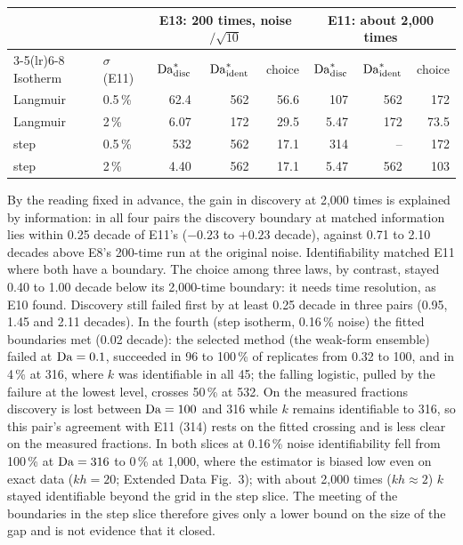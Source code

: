 \begin{center}
\small
\begin{tabular}{llrrrrrr}
\toprule
& & \multicolumn{3}{c}{E13: 200 times, noise$/\sqrt{10}$} & \multicolumn{3}{c}{E11: about 2,000 times} \\
\cmidrule(lr){3-5}\cmidrule(lr){6-8}
Isotherm & $\sigma$ (E11) & $\mathrm{Da}^{*}_{\mathrm{disc}}$ & $\mathrm{Da}^{*}_{\mathrm{ident}}$ & choice & $\mathrm{Da}^{*}_{\mathrm{disc}}$ & $\mathrm{Da}^{*}_{\mathrm{ident}}$ & choice \\
\midrule
Langmuir & 0.5\,\% & 62.4 & 562 & 56.6 & 107 & 562 & 172 \\
Langmuir & 2\,\% & 6.07 & 172 & 29.5 & 5.47 & 172 & 73.5 \\
step & 0.5\,\% & 532 & 562 & 17.1 & 314 & -- & 172 \\
step & 2\,\% & 4.40 & 562 & 17.1 & 5.47 & 562 & 103 \\
\bottomrule
\end{tabular}
\end{center}
By the reading fixed in advance, the gain in discovery at 2,000 times is explained by information: in all four
pairs the discovery boundary at matched information lies within 0.25 decade of E11's ($-0.23$ to $+0.23$
decade), against 0.71 to 2.10 decades above E8's 200-time run at the original noise. Identifiability matched E11
where both have a boundary. The choice among three laws, by contrast, stayed 0.40 to 1.00 decade below its
2,000-time boundary: it needs time resolution, as E10 found. Discovery still failed first by at least
0.25 decade in three pairs (0.95, 1.45 and 2.11 decades). In the fourth (step isotherm, 0.16\,\% noise) the
fitted boundaries met (0.02 decade): the selected method (the weak-form ensemble) failed at $\mathrm{Da} = 0.1$,
succeeded in 96 to 100\,\% of replicates from 0.32 to 100, and in 4\,\% at 316, where $k$ was identifiable in
all 45; the falling logistic, pulled by the failure at the lowest level, crosses 50\,\% at 532. On the
measured fractions discovery is lost between $\mathrm{Da} = 100$ and 316 while $k$ remains identifiable to 316, so
this pair's agreement with E11 (314) rests on the fitted crossing and is less clear on the measured fractions.
In both slices at 0.16\,\% noise identifiability fell from 100\,\% at $\mathrm{Da} = 316$ to 0\,\% at 1,000, where the
estimator is biased low even on exact data ($kh = 20$; Extended Data Fig.~3); with about 2,000 times ($kh \approx 2$)
$k$ stayed identifiable beyond the grid in the step slice. The meeting of the boundaries in the step slice
therefore gives only a lower bound on the size of the gap and is not evidence that it closed.


